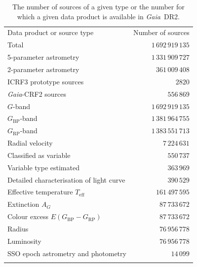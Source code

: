 \documentclass[longauth]{aa_gaia} %
\newcommand\gaia{\textit{Gaia}}
\newcommand\gdr[1]{\gaia~DR#1}
\newcommand\gaiacrftwo{\gaia-CRF2}
\newcommand\gdrtwototnum{\ensuremath{1\,692\,919\,135}}
\newcommand\gdrtwovarnum{\ensuremath{550\,737}}
\newcommand\gdrtwovartypednum{\ensuremath{363\,969}}
\newcommand\gdrtwovarsostotnum{\ensuremath{390\,529}}
\newcommand\gdrtwossonum{\ensuremath{14\,099}}
\newcommand\gdrtwovradnum{\ensuremath{7\,224\,631}}
\newcommand\gdrtwofivepnum{\ensuremath{1\,331\,909\,727}}
\newcommand\gdrtwotwopnum{\ensuremath{361\,009\,408}}
\newcommand\gdrtwogbandnum{\ensuremath{1\,692\,919\,135}}
\newcommand\gdrtwobpbandnum{\ensuremath{1\,381\,964\,755}}
\newcommand\gdrtworpbandnum{\ensuremath{1\,383\,551\,713}}
\newcommand\gdrtwoteffnum{\ensuremath{161\,497\,595}}
\newcommand\gdrtwoagnum{\ensuremath{87\,733\,672}}
\newcommand\gdrtwoebpminrpnum{\ensuremath{87\,733\,672}}
\newcommand\gdrtworadiusnum{\ensuremath{76\,956\,778}}
\newcommand\gdrtwolumnum{\ensuremath{76\,956\,778}}
\newcommand\gdrtwoicrfthree{\ensuremath{2820}}
\newcommand\gdrtwogaiacrftwo{\ensuremath{556\,869}}
\newcommand\gbp{\ensuremath{G_\mathrm{BP}}}
\newcommand\grp{\ensuremath{G_\mathrm{RP}}}
\newcommand\teff{\ensuremath{T_\mathrm{eff}}}
\newcommand\ag{\ensuremath{A_G}}
\newcommand\ebpminrp{\ensuremath{E(\gbp-\grp)}}
\begin{document}
\begin{table}[t]
  \caption{The number of sources of a given type or the number for which a given data product is
    available in \gdr{2}.}
  \label{tab:gdr2stats}
  \centering
  \begin{tabular}{lr}
    \hline\hline
    \noalign{\smallskip}
    Data product or source type & Number of sources \\
    \noalign{\smallskip}
    \hline
    \noalign{\smallskip}
    Total & \gdrtwototnum \\
    \noalign{\smallskip}
    5-parameter astrometry & \gdrtwofivepnum \\
    2-parameter astrometry & \gdrtwotwopnum \\
    ICRF3 prototype sources & \gdrtwoicrfthree \\
    {\gaiacrftwo} sources & \gdrtwogaiacrftwo \\
    \noalign{\smallskip}
    $G$-band & \gdrtwogbandnum \\
    \gbp-band & \gdrtwobpbandnum \\
    \grp-band & \gdrtworpbandnum \\
    \noalign{\smallskip}
    Radial velocity & \gdrtwovradnum \\
    \noalign{\smallskip}
    Classified as variable & \gdrtwovarnum \\
    Variable type estimated & \gdrtwovartypednum \\
    Detailed characterisation of light curve & \gdrtwovarsostotnum \\
    \noalign{\smallskip}
    Effective temperature {\teff} & \gdrtwoteffnum \\
    Extinction {\ag} & \gdrtwoagnum \\
    Colour excess {\ebpminrp} & \gdrtwoebpminrpnum \\
    Radius & \gdrtworadiusnum \\
    Luminosity & \gdrtwolumnum \\
    \noalign{\smallskip}
    SSO epoch astrometry and photometry & \gdrtwossonum \\
    \noalign{\smallskip}
    \hline
  \end{tabular}
\end{table}
\end{document}
